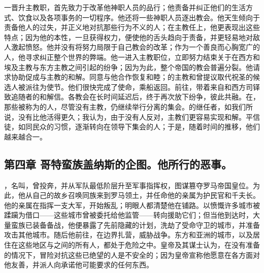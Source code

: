 一晋升主教职，首先致力于改革他神职人员的品行；他责备并纠正他们的生活方式、饮食以及各项事务的一切程序。他还将一些神职人员逐出教会。他天生倾向于责备他人的过失，并正义地对抗那些行为不义的人；在主教任上，他更表现出这些特点；因为他的本性，一旦获得权力，便使他的舌头趋向于责备，并更轻易地对敌人激起愤怒。他并没有将努力局限于自己教会的改革；作为一个善良而心胸宽广的人，他寻求纠正整个世界的弊端。他一进入主教职位，立即努力结束关于在西方和埃及主教与东方主教之间引起的纷争；因为为此，整个帝国的教会普遍分裂。他请求协助促成与主教的和解。同意与他合作恢复和睦；的主教和曾提议取代祝圣的候选人被派往为使节。他们很快完成了使命，乘船返回。前往，带着来自和西方司铎致追随者的和解信。各教会在长时间延迟后，终于再次放下纷争，彼此共融。在，那些被称为的人，尽管没有主教，仍继续举行分离的集会。的继任者，如我们所说，没有比他活得更久；我认为，由于没有人反对，主教们更容易实现和解。平信徒，如同民众的习惯，逐渐转向在领导下集会的人；于是，随着时间的推移，他们越来越合一。\newline{}\par


\subsection{第四章 哥特蛮族盖纳斯的企图。他所行的恶事。}

，名叫，曾投奔，并从军队最低阶层升至军事指挥权，图谋篡夺罗马帝国皇位。为此，他从自己的故乡召唤同族来到罗马领土，并任命他的亲属为护民官和千夫长。他的亲属在指挥一支大军，开始叛乱；明眼人都清楚他在铺路。以愤慨许多城市被蹂躏为借口——这些城市曾被委托给他监管——转向援助它们；但当他到达时，大量蛮族已装备备战，他便暴露了先前隐藏的计划，洗劫了受命守卫的城市，并准备攻击其他城市。随后他前往，在边界扎营，威胁战争。东方和亚洲的城市，以及居住在这些地区与之间的所有人，都处于危险之中。皇帝及其谋士认为，在没有准备的情况下，冒险对抗这些已绝望的人是不安全的；因为皇帝宣称他愿意在各方面对他友善，并派人向承诺他可能要求的任何东西。\newline{}\par

